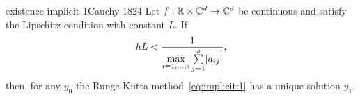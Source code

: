 \begin{Lemma}{existence-implicit-1}{Cauchy 1824}
  Let $f:\mathbb R\times\mathbb C^d\to\mathbb C^d$ be continuous and satisfy the Lipschitz
  condition with constant $L$. If
  \begin{gather}
    \label{eq:existence-implicit-1:1}
    hL < \frac1{\max\limits_{i=1,\dots,s} \sum\limits_{j=1}^s \lvert a_{ij}\rvert},
  \end{gather}
  then, for any $y_0$ the Runge-Kutta method~\eqref{eq:implicit:1} has a unique
  solution $y_1$.
\end{Lemma}

